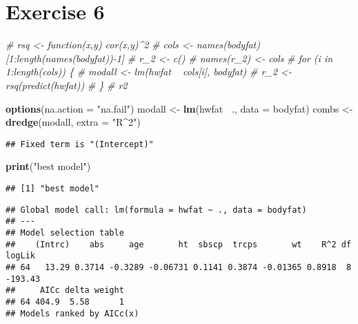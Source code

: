 \documentclass[]{article}
\newenvironment{Shaded}{\begin{snugshade}}{\end{snugshade}}
\newcommand{\CommentTok}[1]{\textcolor[rgb]{0.56,0.35,0.01}{\textit{#1}}}
\newcommand{\DataTypeTok}[1]{\textcolor[rgb]{0.13,0.29,0.53}{#1}}
\newcommand{\KeywordTok}[1]{\textcolor[rgb]{0.13,0.29,0.53}{\textbf{#1}}}
\newcommand{\NormalTok}[1]{#1}
\newcommand{\OperatorTok}[1]{\textcolor[rgb]{0.81,0.36,0.00}{\textbf{#1}}}
\newcommand{\StringTok}[1]{\textcolor[rgb]{0.31,0.60,0.02}{#1}}
\begin{document}
\hypertarget{exercise-6}{%
\section{Exercise 6}\label{exercise-6}}

\begin{Shaded}
\begin{Highlighting}[]
\CommentTok{# rsq <- function(x,y) cor(x,y)^2}
\CommentTok{# cols <- names(bodyfat)[1:length(names(bodyfat))-1]}
\CommentTok{# r_2 <- c()}
\CommentTok{# names(r_2) <- cols}
\CommentTok{# for (i in 1:length(cols)) \{}
\CommentTok{#     modall <- lm(hwfat ~ cols[i], bodyfat)}
\CommentTok{#     r_2 <- rsq(predict(hwfat))}
\CommentTok{# \}}
\CommentTok{# r2}
\end{Highlighting}
\end{Shaded}

\begin{Shaded}
\begin{Highlighting}[]
\KeywordTok{options}\NormalTok{(}\DataTypeTok{na.action =} \StringTok{"na.fail"}\NormalTok{)}
\NormalTok{modall <-}\StringTok{ }\KeywordTok{lm}\NormalTok{(hwfat }\OperatorTok{~}\NormalTok{., }\DataTypeTok{data =}\NormalTok{ bodyfat)}
\NormalTok{combs <-}\StringTok{ }\KeywordTok{dredge}\NormalTok{(modall, }\DataTypeTok{extra =} \StringTok{"R^2"}\NormalTok{)}
\end{Highlighting}
\end{Shaded}

\begin{verbatim}
## Fixed term is "(Intercept)"
\end{verbatim}

\begin{Shaded}
\begin{Highlighting}[]
\KeywordTok{print}\NormalTok{(}\StringTok{"best model"}\NormalTok{)}
\end{Highlighting}
\end{Shaded}

\begin{verbatim}
## [1] "best model"
\end{verbatim}

\begin{Shaded}
\end{Shaded}

\begin{verbatim}
## Global model call: lm(formula = hwfat ~ ., data = bodyfat)
## ---
## Model selection table 
##    (Intrc)    abs     age       ht  sbscp  trcps       wt    R^2 df  logLik
## 64   13.29 0.3714 -0.3289 -0.06731 0.1141 0.3874 -0.01365 0.8918  8 -193.43
##     AICc delta weight
## 64 404.9  5.58      1
## Models ranked by AICc(x)
\end{verbatim}
\end{document}

